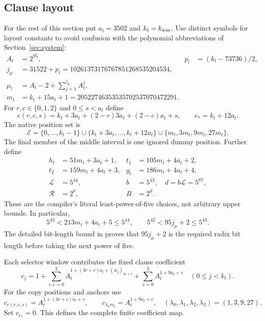 \documentclass[11pt,a4paper]{article}
\theoremstyle{definition}\newtheorem{definition}[theorem]{Definition}
\newcommand{\file}[1]{\texttt{\detokenize{#1}}}
\begin{document}
\subsection{Clause layout}
For the rest of this section put $a_t=3502$ and $k_t=k_{\rm win}$.
Use distinct symbols for layout constants to avoid confusion with the
polynomial abbreviations of Section~\ref{sec:system}:
\begin{align*}
 A_t&=2^{95},&
 p_t&=(k_t-73736)/2,\\
 j_\mu&=31522+p_t=10261373176767851268535204534,\\
 \mu_t&=A_t-2+\sum_{j=1}^{j_\mu}A_t^j,\\
 m_t&=k_t+15a_t+1=20522746353535702537070472291.
\end{align*}
For $r,c\in\{0,1,2\}$ and $0\le s<a_t$ define
\[
 e(r,c,s)=k_t+3a_t+(2-r)3a_t+(2-c)a_t+s,
 \qquad e_*=k_t+12a_t.
\]
The native position set is
\[
 \mathcal E=\{0,\ldots,k_t-1\}
 \cup\{k_t+3a_t,\ldots,k_t+12a_t\}
 \cup\{m_t,3m_t,9m_t,27m_t\}.
\]
The final member of the middle interval is one ignored dummy position.
Further define
\begin{align*}
 h_t&=51m_t+3a_t+1,&t_1&=105m_t+4a_t+2,\\
 t_2&=159m_t+4a_t+3,&g_t&=186m_t+4a_t+4,\\
 \mathcal L&=5^{44},&b&=5^{43},\quad d=b\mathcal L=5^{87},\\
 \mathcal R&=2^b,&B&=2^d.
\end{align*}
These are the compiler's literal least-power-of-five choices, not
arbitrary upper bounds. In particular,
\[
 5^{43}<213m_t+4a_t+5\le5^{44},\qquad
 5^{42}<95j_\mu+2\le5^{43}.
\]
The detailed bit-length bound in \file{constants.md} proves that
$95j_\mu+2$ is the required radix bit length before taking the next
power of five.

Each selector window contributes the fixed clause coefficient
\[
 c_j=1+\sum_{r,c=0}^{2}
 A_t^{1+(3r+c)a_t+(w_j)_{3r+c}}
 +\sum_{v=0}^{3}A_t^{1+9a_t+v}
 \quad(0\le j<k_t).
\]
For the copy positions and anchors use
\[
 c_{e(r,c,s)}=A_t^{1+(3r+c)a_t+s},\qquad
 c_{\lambda_v m_t}=A_t^{1+9a_t+v},
 \quad(\lambda_0,\lambda_1,\lambda_2,\lambda_3)=(1,3,9,27).
\]
Set $c_{e_*}=0$. This defines the complete finite coefficient map.
\end{document}
